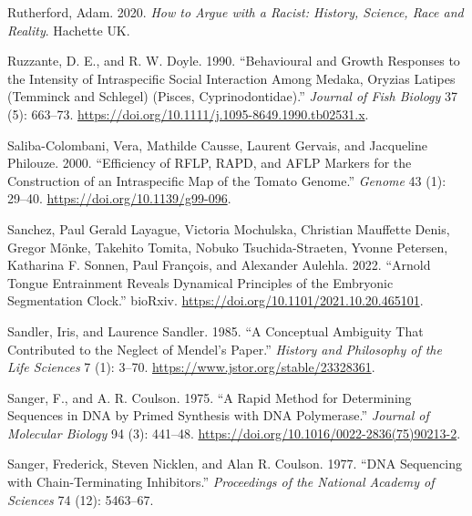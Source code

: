 \documentclass[
]{book}
\newlength{\cslhangindent}
\newlength{\cslentryspacingunit} %
\newenvironment{CSLReferences}[2] %
 {%
  \setlength{\parindent}{0pt}
  \ifodd #1
  \let\oldpar\par
  \def\par{\hangindent=\cslhangindent\oldpar}
  \fi
  \setlength{\parskip}{#2\cslentryspacingunit}
 }%
 {}
\begin{document}
\begin{CSLReferences}{1}{0}
\leavevmode{}%
Rutherford, Adam. 2020. \emph{How to Argue with a Racist: {History}, Science, Race and Reality}. {Hachette UK}.

\leavevmode{}%
Ruzzante, D. E., and R. W. Doyle. 1990. {``Behavioural and Growth Responses to the Intensity of Intraspecific Social Interaction Among Medaka, {Oryzias} Latipes ({Temminck} and {Schlegel}) ({Pisces}, {Cyprinodontidae}).''} \emph{Journal of Fish Biology} 37 (5): 663--73. \url{https://doi.org/10.1111/j.1095-8649.1990.tb02531.x}.

\leavevmode{}%
Saliba-Colombani, Vera, Mathilde Causse, Laurent Gervais, and Jacqueline Philouze. 2000. {``Efficiency of {RFLP}, {RAPD}, and {AFLP} Markers for the Construction of an Intraspecific Map of the Tomato Genome.''} \emph{Genome} 43 (1): 29--40. \url{https://doi.org/10.1139/g99-096}.

\leavevmode{}%
Sanchez, Paul Gerald Layague, Victoria Mochulska, Christian Mauffette Denis, Gregor Mönke, Takehito Tomita, Nobuko Tsuchida-Straeten, Yvonne Petersen, Katharina F. Sonnen, Paul François, and Alexander Aulehla. 2022. {``Arnold Tongue Entrainment Reveals Dynamical Principles of the Embryonic Segmentation Clock.''} {bioRxiv}. \url{https://doi.org/10.1101/2021.10.20.465101}.

\leavevmode{}%
Sandler, Iris, and Laurence Sandler. 1985. {``A {Conceptual Ambiguity} That {Contributed} to the {Neglect} of {Mendel}'s {Paper}.''} \emph{History and Philosophy of the Life Sciences} 7 (1): 3--70. \url{https://www.jstor.org/stable/23328361}.

\leavevmode{}%
Sanger, F., and A. R. Coulson. 1975. {``A Rapid Method for Determining Sequences in {DNA} by Primed Synthesis with {DNA} Polymerase.''} \emph{Journal of Molecular Biology} 94 (3): 441--48. \url{https://doi.org/10.1016/0022-2836(75)90213-2}.

\leavevmode{}%
Sanger, Frederick, Steven Nicklen, and Alan R. Coulson. 1977. {``{DNA} Sequencing with Chain-Terminating Inhibitors.''} \emph{Proceedings of the National Academy of Sciences} 74 (12): 5463--67.


\end{CSLReferences}
\end{document}
